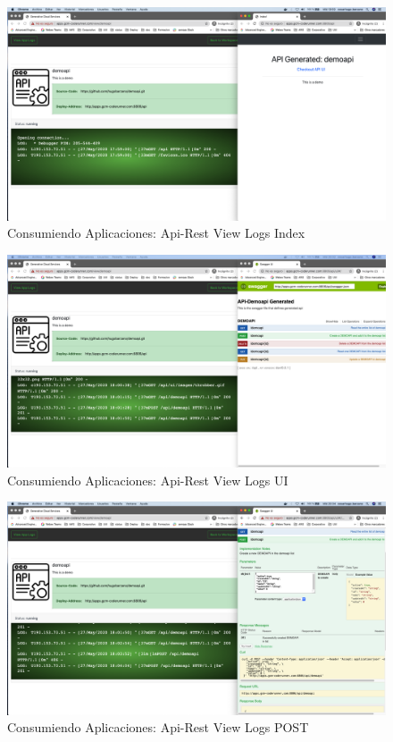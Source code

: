 \documentclass[a4paper,11pt]{book}
\begin{document}
\begin{figure}[H]
\centering
\includegraphics[scale=0.2]{imagenes/casouso/1_7.png}
\caption{  Consumiendo Aplicaciones: Api-Rest View Logs Index }
\end{figure}


\begin{figure}[H]
\centering
\includegraphics[scale=0.2]{imagenes/casouso/1_8.png}
\caption{  Consumiendo Aplicaciones: Api-Rest View Logs UI }
\end{figure}


\begin{figure}[H]
\centering
\includegraphics[scale=0.2]{imagenes/casouso/1_10.png}
\caption{ Consumiendo Aplicaciones: Api-Rest View Logs POST  }
\end{figure}
\end{document}
